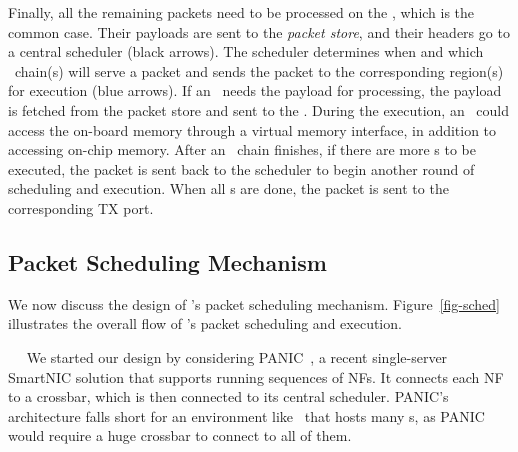 Finally, all the remaining packets need to be processed on the \snic, which is the common case.
Their payloads are sent to the {\em packet store}, and their headers go to a central scheduler (black arrows). 
The scheduler determines when and which \nt\ chain(s) will serve a packet and sends the packet to the corresponding region(s) for execution (blue arrows).
If an \nt\ needs the payload for processing, the payload is fetched from the packet store and sent to the \nt.
During the execution, an \nt\ could access the on-board memory through a virtual memory interface, in addition to accessing on-chip memory.
After an \nt\ chain finishes, if there are more \nt{}s to be executed, the packet is sent back to the scheduler to begin another round of scheduling and execution.
When all \nt{}s are done, the packet is sent to the corresponding TX port.


\subsection{Packet Scheduling Mechanism}
\label{sec:packetsched}

We now discuss the design of \snic's packet scheduling mechanism. Figure~\ref{fig-sched} illustrates the overall flow of \snic's packet scheduling and execution.

~~
We started our design by considering PANIC~\cite{panic-osdi20}, a recent single-server SmartNIC solution that supports running sequences of NFs.
It connects each NF to a crossbar, which is then connected to its central scheduler.
PANIC's architecture falls short for an environment like \snic\ that hosts many \nt{}s,
as PANIC would require a huge crossbar to connect to all of them.

